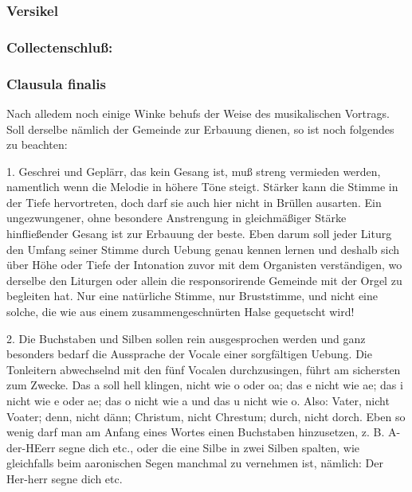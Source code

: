 \subsubsection{Versikel}


\subsubsection{Collectenschluß:}

\subsubsection{Clausula finalis}


Nach alledem noch einige Winke behufs der Weise des musikalischen Vortrags. Soll derselbe nämlich der Gemeinde zur Erbauung dienen, so ist noch folgendes zu beachten:

1. Geschrei und Geplärr, das kein Gesang ist, muß streng vermieden werden, namentlich wenn die Melodie in höhere Töne steigt. Stärker kann die Stimme in der Tiefe hervortreten, doch darf sie auch hier nicht in Brüllen ausarten. Ein ungezwungener, ohne besondere Anstrengung in gleichmäßiger Stärke hinfließender Gesang ist zur Erbauung der beste. Eben darum soll jeder Liturg den Umfang seiner Stimme durch Uebung genau kennen lernen und deshalb sich über Höhe oder Tiefe der Intonation zuvor mit dem Organisten
verständigen, wo derselbe den Liturgen oder allein die responsorirende Gemeinde mit der Orgel zu begleiten hat. Nur eine natürliche Stimme, nur Bruststimme, und nicht eine solche, die wie aus einem zusammengeschnürten Halse gequetscht wird!

2. Die Buchstaben und Silben sollen rein ausgesprochen werden und ganz besonders bedarf die Aussprache der Vocale einer sorgfältigen Uebung. Die Tonleitern abwechselnd mit den fünf Vocalen durchzusingen, führt am sichersten zum Zwecke. Das a soll hell klingen, nicht wie o oder oa; das e nicht wie ae; das i nicht wie e oder ae; das o nicht wie a und das u nicht wie o. Also: Vater, nicht Voater; denn, nicht dänn; Christum, nicht Chrestum; durch, nicht dorch. Eben so wenig darf man am Anfang eines Wortes einen Buchstaben hinzusetzen, z. B. A-der-HEerr segne dich etc., oder die eine Silbe in zwei Silben spalten, wie gleichfalls beim aaronischen Segen manchmal zu vernehmen ist, nämlich: Der Her-herr segne dich etc.

